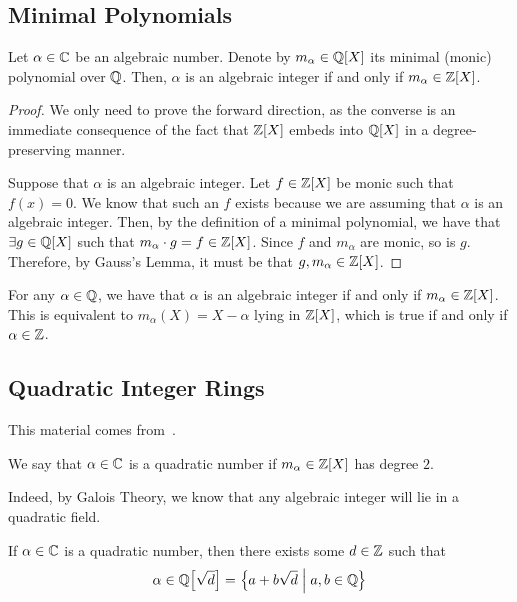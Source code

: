 \subsection{Minimal Polynomials}

\begin{boxproposition}
    Let $\alpha \in \mathbb{C}$ be an algebraic number. Denote by $m_{\alpha} \in \mathbb{Q}[X]$ its minimal (monic) polynomial over $\mathbb{Q}$. Then, $\alpha$ is an algebraic integer if and only if $m_{\alpha} \in \mathbb{Z}[X]$.
\end{boxproposition}
\begin{proof}
    We only need to prove the forward direction, as the converse is an immediate consequence of the fact that $\mathbb{Z}[X]$ embeds into $\mathbb{Q}[X]$ in a degree-preserving manner.

    Suppose that $\alpha$ is an algebraic integer. Let $f \in \mathbb{Z}[X]$ be monic such that $f(x) = 0$. We know that such an $f$ exists because we are assuming that $\alpha$ is an algebraic integer. Then, by the definition of a minimal polynomial, we have that $\exists g \in \mathbb{Q}[X]$ such that $m_{\alpha} \cdot g = f \in \mathbb{Z}[X]$. Since $f$ and $m_{\alpha}$ are monic, so is $g$. Therefore, by Gauss's Lemma, it must be that $g, m_{\alpha} \in \mathbb{Z}[X]$.
\end{proof}

\begin{boxexample}
    For any $\alpha \in \mathbb{Q}$, we have that $\alpha$ is an algebraic integer if and only if $m_{\alpha} \in \mathbb{Z}[X]$. This is equivalent to $m_{\alpha}(X) = X - \alpha$ lying in $\mathbb{Z}[X]$, which is true if and only if $\alpha \in \mathbb{Z}$.
\end{boxexample}

\subsection{Quadratic Integer Rings}

This material comes from~\cite[\S 2.1]{GeorgeBoxer}.

\begin{boxdefinition}
    We say that $\alpha \in \mathbb{C}$ is a quadratic number if $m_{\alpha} \in \mathbb{Z}[X]$ has degree  $2$.
\end{boxdefinition}

Indeed, by Galois Theory, we know that any algebraic integer will lie in a quadratic field.

\begin{boxlemma}
    If $\alpha \in \mathbb{C}$ is a quadratic number, then there exists some $d \in \mathbb{Z}$ such that
    \begin{align*}
        \alpha \in \mathbb{Q}\!\left[ \sqrt{d} \right] = \left\{ a + b\sqrt{d} \; \middle\vert \; a, b \in \mathbb{Q} \right\}
    \end{align*}
\end{boxlemma}

